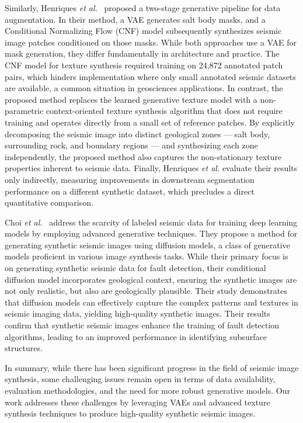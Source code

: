 \documentclass{ieeeaccess}
\begin{document}
Similarly, Henriques \emph{et al.}~\cite{Henriques2021} proposed a two-stage generative pipeline for data augmentation. In their method, a VAE generates salt body masks, and a Conditional Normalizing Flow (CNF) model subsequently synthesizes seismic image patches conditioned on those masks. While both approaches use a VAE for mask generation, they differ fundamentally in architecture and practice. The CNF model for texture synthesis required training on 24,872 annotated patch pairs, which hinders implementation where only small annotated seismic datasets are available, a common situation in geosciences applications. In contrast, the proposed method replaces the learned generative texture model with a non-parametric context-oriented texture synthesis algorithm that does not require training and operates directly from a small set of reference patches. By explicitly decomposing the seismic image into distinct geological zones --- salt body, surrounding rock, and boundary regions --- and synthesizing each zone independently, the proposed method also captures the non-stationary texture properties inherent to seismic data. Finally, Henriques \emph{et al.} evaluate their results only indirectly, measuring improvements in downstream segmentation performance on a different synthetic dataset, which precludes a direct quantitative comparison.

Choi \emph{et al.}~\cite{Choi2025} address the scarcity of labeled seismic data for training deep learning models by employing advanced generative techniques. They propose a method for generating synthetic seismic images using diffusion models, a class of generative models proficient in various image synthesis tasks. While their primary focus is on generating synthetic seismic data for fault detection, their conditional diffusion model incorporates geological context, ensuring the synthetic images are not only realistic, but also are geologically plausible. Their study demonstrates that diffusion models can effectively capture the complex patterns and textures in seismic imaging data, yielding high-quality synthetic images. Their results confirm that synthetic seismic images enhance the training of fault detection algorithms, leading to an improved performance in identifying subsurface structures.

In summary, while there has been significant progress in the field of seismic image synthesis, some challenging issues  remain open in terms of data availability, evaluation methodologies, and the need for more robust generative models. Our work addresses these challenges by leveraging VAEs and advanced texture synthesis techniques to produce high-quality synthetic seismic images.
\end{document}
